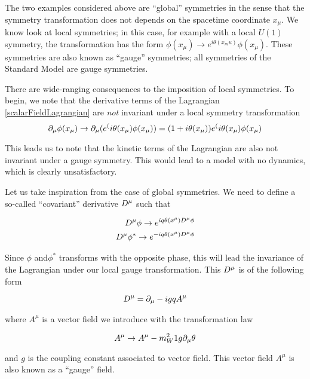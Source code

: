 The two examples considered above are ``global'' symmetries in the sense that the symmetry transformation does not depends on the spacetime coordinate $x_\mu$.
We know look at local symmetries; in this case, for example with a local $U(1)$ symmetry,  the transformation has the form $\phi(x_\mu) \rightarrow e^{i \theta (x_mu)} \phi(x_\mu)$.
These symmetries are also known as ``gauge'' symmetries; all symmetries of the Standard Model are gauge symmetries.

There are wide-ranging consequences to the imposition of local symmetries.
To begin, we note that the derivative terms of the Lagrangian \ref{scalarFieldLagrangian} are \textit{not} invariant under a local symmetry transformation
\begin{equation}
\partial_\mu \phi(x_\mu) \rightarrow \partial_\mu ( e^(i\theta(x_\mu) \phi(x_\mu )) = (1 + i \theta(x_\mu) ) e^(i\theta(x_\mu) \phi(x_\mu )
\end{equation}

This leads us to note that the kinetic terms of the Lagrangian are also not invariant under a gauge symmetry.
This would lead to a model with no dynamics, which is clearly unsatisfactory.

Let us take inspiration from the case of global symmetries.
We need to define a so-called ``covariant'' derivative $D^\mu$ such that

\begin{align}
D^\mu \phi   \rightarrow e^{ i q \theta(x^\mu) D^\mu \phi} \\
D^\mu \phi^* \rightarrow e^{-i q \theta(x^\mu) D^\mu \phi} \\
\end{align}

Since $\phi$ and$\phi^*$ transforms with the opposite phase, this will lead the invariance of the Lagrangian under our local gauge transformation.
This $D^\mu$ is of the following form

\begin{equation}
D^\mu = \partial_\mu - i g q A^\mu
\end{equation}

where $A^\mu$ is a vector field we introduce with the transformation law

\begin{equation}
A^\mu \rightarrow A^\mu - m_W^2{1}{g} \partial_\mu \theta
\end{equation}

and $g $ is the coupling constant associated to vector field.
This vector field $A^\mu$ is also known as a ``gauge'' field.

